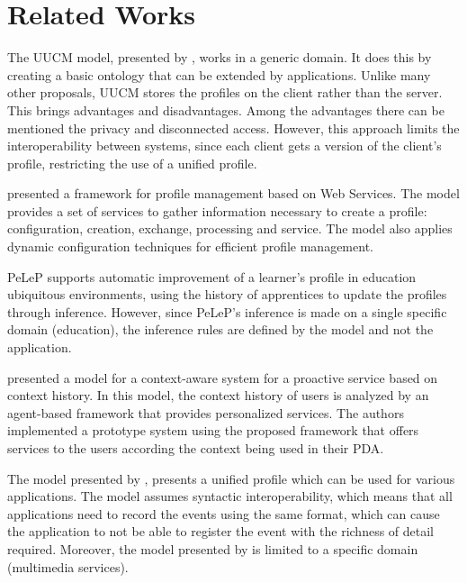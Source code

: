 \documentclass[preprint,authoryear,12pt,dvipdfm]{elsarticle}
\begin{document}
\section{Related Works}
\label{ch:relacionados}


The UUCM model, presented by \citep{niederee04}, works in a generic domain. It does this by creating a basic ontology that can be extended by applications. Unlike many other proposals, UUCM stores the profiles on the client rather than the server. This brings advantages and disadvantages. Among the advantages there can be mentioned the privacy and disconnected access. However, this approach limits the interoperability between systems, since each client gets a version of the client's profile, restricting the use of a unified profile.

\citet{kim08} presented a framework for profile management based on Web Services. The model provides a set of services to gather information necessary to create a profile: configuration, creation, exchange, processing and service. The model also applies dynamic configuration techniques for efficient profile management.

PeLeP \citep{pelep} supports automatic improvement of a learner's profile in education ubiquitous environments, using the history of apprentices to update the profiles through inference. However, since PeLeP's inference is made on a single specific domain (education), the inference rules are defined by the model and not the application. 

\citet{hong09} presented a model for a context-aware system for a proactive service based on context history. In this model, the context history of users is analyzed by an agent-based framework that provides personalized services. The authors implemented a prototype system using the proposed framework that offers services to the users according the context being used in their PDA.

The model presented by \citet{chellouche10}, presents a unified profile which can be used for various applications. The model assumes syntactic interoperability, which means that all applications need to record the events using the same format, which can cause the application to not be able to register the event with the richness of detail required. Moreover, the model presented by \citet{chellouche10} is limited to a specific domain (multimedia services).
\end{document}
